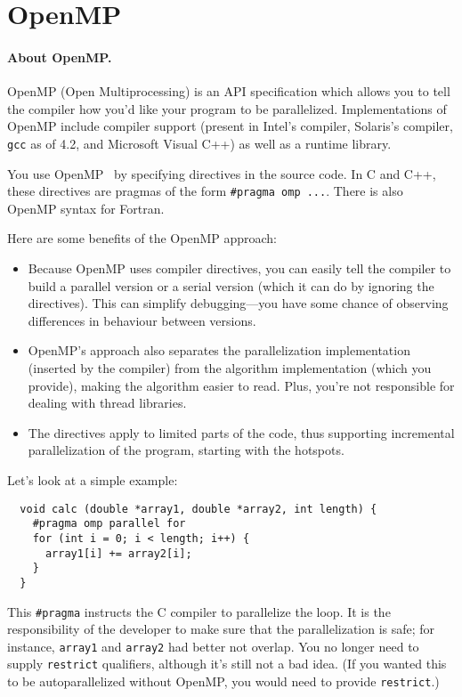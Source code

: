 




\section*{OpenMP}

\paragraph{About OpenMP.} OpenMP (Open Multiprocessing) 
is an API specification which allows you to tell the compiler how you'd 
like your program to be parallelized. Implementations of OpenMP 
include compiler support (present in Intel's compiler, Solaris's 
compiler, {\tt gcc} as of 4.2, and Microsoft Visual C++) as well as a 
runtime library.

You use OpenMP~\cite{omptutorial} by specifying
directives in the source code. In C and C++, these directives are
pragmas of the form \verb+#pragma omp ...+. There is also OpenMP
syntax for Fortran. 

Here are some benefits of the OpenMP approach:
\begin{itemize}
\item Because OpenMP uses compiler directives, you can easily tell the
  compiler to build a parallel version or a serial version (which it can do by
  ignoring the directives). This can simplify debugging---you
  have some chance of observing differences in behaviour between 
  versions.
\item OpenMP's approach also separates the parallelization
  implementation (inserted by the compiler) from the algorithm
  implementation (which you provide), making the algorithm easier to
  read. Plus, you're not responsible for dealing with thread libraries.
\item The directives apply to limited parts of the code, thus supporting
  incremental parallelization of the program, starting with the hotspots.
\end{itemize}

Let's look at a simple example:
{\small
\begin{verbatim}
  void calc (double *array1, double *array2, int length) {
    #pragma omp parallel for
    for (int i = 0; i < length; i++) {
      array1[i] += array2[i];
    }
  }
\end{verbatim}
}
This \verb+#pragma+ instructs the C compiler to parallelize the
loop. It is the responsibility of the developer to make sure that
the parallelization is safe; for instance, {\tt array1} and {\tt array2}
had better not overlap. You no longer need to supply {\tt restrict}
qualifiers, although it's still not a bad idea. (If you wanted this
to be autoparallelized without OpenMP, you would need to provide
{\tt restrict}.)

